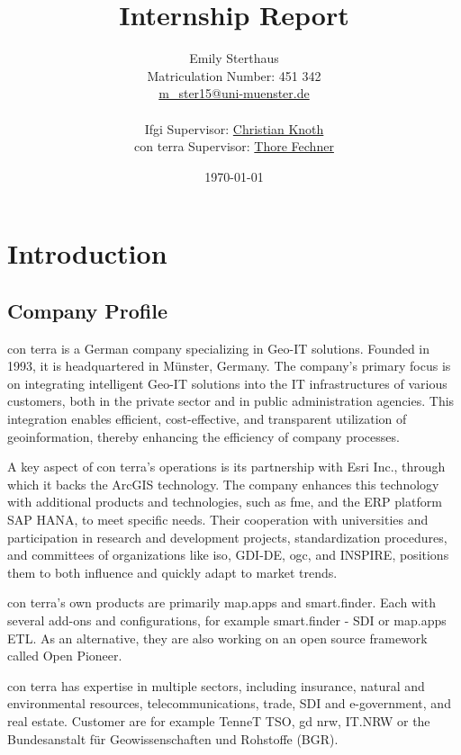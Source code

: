 \documentclass[11pt, titlepage, a4paper]{article}
\title{Internship Report}
\author{Emily Sterthaus \\ Matriculation Number: 451 342 \\ \href{mailto:m_ster15@uni-muenster.de}{m\_ster15@uni-muenster.de}\\ \\
\small Ifgi Supervisor: \href{mailto:christian.knoth@uni-muenster.de}{Christian Knoth}\\ \small con terra Supervisor: \href{mailto:t.fechner@conterra.de}{Thore Fechner}
}
\date{\today}
\begin{document}
\maketitle
\newpage
\tableofcontents
\newpage

\section{Introduction}

\subsection{Company Profile}

con terra is a German company specializing in Geo-IT solutions. Founded in 1993, it is headquartered in Münster, Germany. The company's primary focus is on integrating intelligent Geo-IT solutions into the IT infrastructures of various customers, both in the private sector and in public administration agencies. This integration enables efficient, cost-effective, and transparent utilization of geoinformation, thereby enhancing the efficiency of company processes.

A key aspect of con terra's operations is its partnership with Esri Inc., through which it backs the ArcGIS technology. The company enhances this technology with additional products and technologies, such as \gls{fme}, and the ERP platform SAP HANA, to meet specific needs. Their cooperation with universities and participation in research and development projects, standardization procedures, and committees of organizations like \gls{iso}, GDI-DE, \gls{ogc}, and INSPIRE, positions them to both influence and quickly adapt to market trends.

con terra's own products are primarily map.apps and smart.finder. Each with several add-ons and configurations, for example smart.finder - SDI or map.apps ETL. As an alternative, they are also working on an open source framework called Open Pioneer.

con terra has expertise in multiple sectors, including insurance, natural and environmental resources, telecommunications, trade, SDI and e-government, and real estate. Customer are for example TenneT TSO,  \gls {gd} \gls{nrw}, IT.NRW or the Bundesanstalt für Geowissenschaften und Rohstoffe  (BGR).
\end{document}
